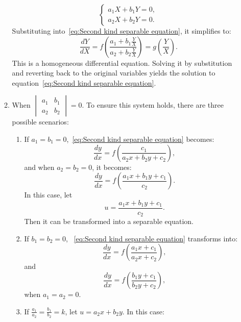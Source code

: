 \documentclass[11pt]{../../TexTemplate/elegantbook}
\begin{document}
\begin{itemize}
\begin{enumerate}
\[\begin{cases}
                a_1X + b_1Y = 0, \\
                a_2X + b_2Y = 0.
                \end{cases}
                \]
                Substituting into~\ref{eq:Second kind separable equation}, it simplifies to:
                \[
                \frac{dY}{dX} 
                = f\left(\frac{a_1 + b_1 \frac{Y}{X}}{a_2 + b_2 \frac{Y}{X}}\right) 
                = g\left(\frac{Y}{X}\right).
                \]
                This is a homogeneous differential equation. 
                Solving it by substitution and reverting back to the original variables 
                yields the solution to equation~\ref{eq:Second kind separable equation}.
            \item When \(\begin{vmatrix} a_1 & b_1 \\ a_2 & b_2 \end{vmatrix} = 0\). 
                To ensure this system holds, there are three possible scenarios:
                \begin{enumerate}
                    \item  If \(a_1 = b_1 = 0\),~\ref{eq:Second kind separable equation} becomes:
                        \[
                        \frac{dy}{dx} = f\left(\frac{c_1}{a_2x + b_2y + c_2}\right),
                        \]
                        and when \(a_2 = b_2 = 0\), it becomes:
                        \[
                        \frac{dy}{dx} = f\left(\frac{a_1x + b_1y + c_1}{c_2}\right).
                        \]
                        In this case, 
                        let
                        \[
                        u = \frac{a_1x + b_1y + c_1}{c_2}.
                        \]
                        Then it can be transformed into a separable equation.
                    \item  If \(b_1 = b_2 = 0\), ~\ref{eq:Second kind separable equation} transforms into:
                        \[
                        \frac{dy}{dx} = f\left(\frac{a_1x + c_1}{a_2x + c_2}\right),
                        \]
                        and
                        \[
                        \frac{dy}{dx} = f\left(\frac{b_1y + c_1}{b_2y + c_2}\right),
                        \]
                        when \(a_1 = a_2 = 0\). 
                    \item If \(\frac{a_1}{a_2} = \frac{b_1}{b_2} = k\), let \(u = a_2x + b_2y\). In this case:
                        \begin{gather*}

\end{gather*}
\end{enumerate}
\end{enumerate}
\end{itemize}
\end{document}
